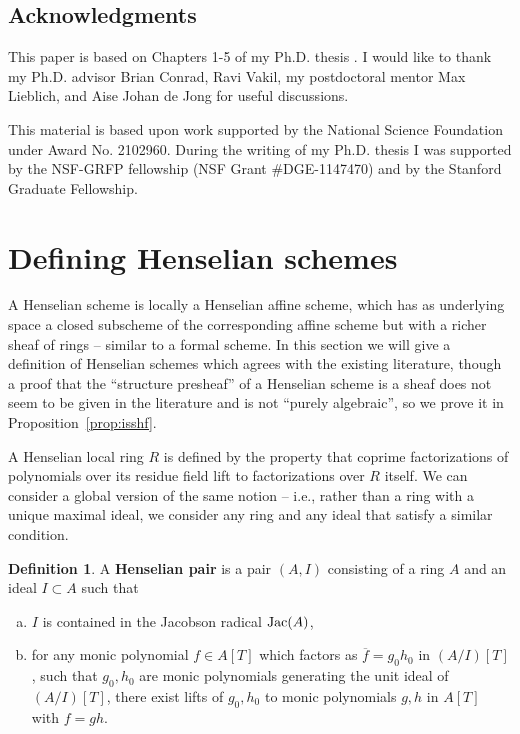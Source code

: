 \documentclass[12pt]{article}
\newcommand{\Jac}{{\rm Jac}}
\newcommand{\ol}[1]{\overline{#1}}
\theoremstyle{definition}
\newtheorem{definition}[theorem]{Definition}
\numberwithin{equation}{subsection}
\begin{document}
\subsection{Acknowledgments}

This paper is based on Chapters 1-5 of my Ph.D. thesis \cite{sheelathesis}. I would like to thank my Ph.D. advisor Brian Conrad, Ravi Vakil, my postdoctoral mentor Max Lieblich, and Aise Johan de Jong for useful discussions.

This material is based upon work supported by the National Science Foundation under Award No. 2102960. During the writing of my Ph.D. thesis I was supported by the NSF-GRFP fellowship (NSF Grant \#DGE-1147470) and by the Stanford Graduate Fellowship.  

\section{Defining Henselian schemes}\label{sec:def} 


 A Henselian scheme is locally a Henselian affine scheme, which has as underlying space a closed subscheme of the corresponding affine scheme but with a richer sheaf of rings -- similar to a formal scheme. In this section we will give a definition of Henselian schemes which agrees with the existing literature, though a proof that the ``structure presheaf'' of a Henselian scheme is a sheaf does not seem to be given in the literature and is not ``purely algebraic'', so we prove it in Proposition~\ref{prop:isshf}.
 
A Henselian local ring $R$ is defined by the property that coprime factorizations of polynomials over its residue field lift to factorizations over $R$ itself. We can consider a global version of the same notion -- i.e., rather than a ring with a unique maximal ideal, we consider any ring and any ideal that satisfy a similar condition.

\begin{definition}\label{def:henspair} A {\bf Henselian pair} is a pair $(A,I)$ consisting of a ring $A$ and an ideal $I \subset A$ such that \begin{enumerate}[(a)]
\item $I$ is contained in the Jacobson radical $\Jac(A)$,
\item for any monic polynomial $f \in A[T]$ which factors as $\ol{f}=g_0h_0$ in $(A/I)[T]$, such that $g_0,h_0$ are monic polynomials generating the unit ideal of $(A/I)[T]$, there exist lifts of $g_0,h_0$ to monic polynomials $g,h$ in $A[T]$ with $f=gh$. 
\end{enumerate}
\end{definition}
\end{document}
